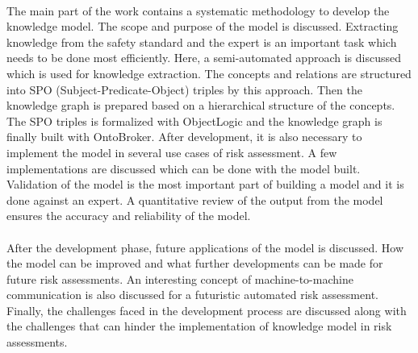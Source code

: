 \paragraph{} The main part of the work contains a systematic methodology to develop the knowledge model. The scope and purpose of the model is discussed. Extracting knowledge from the safety standard and the expert is an important task which needs to be done most efficiently. Here, a semi-automated approach is discussed which is used for knowledge extraction. The concepts and relations are structured into SPO (Subject-Predicate-Object) triples by this approach. Then the knowledge graph is prepared based on a hierarchical structure of the concepts. The SPO triples is formalized with ObjectLogic and the knowledge graph is finally built with OntoBroker. After development, it is also necessary to implement the model in several use cases of risk assessment. A few implementations are discussed which can be done with the model built. Validation of the model is the most important part of building a model and it is done against an expert. A quantitative review of the output from the model ensures the accuracy and reliability of the model.

\paragraph{} After the development phase, future applications of the model is discussed. How the model can be improved and what further developments can be made for future risk assessments. An interesting concept of machine-to-machine communication is also discussed for a futuristic automated risk assessment. Finally, the challenges faced in the development process are discussed along with the challenges that can hinder the implementation of knowledge model in risk assessments.